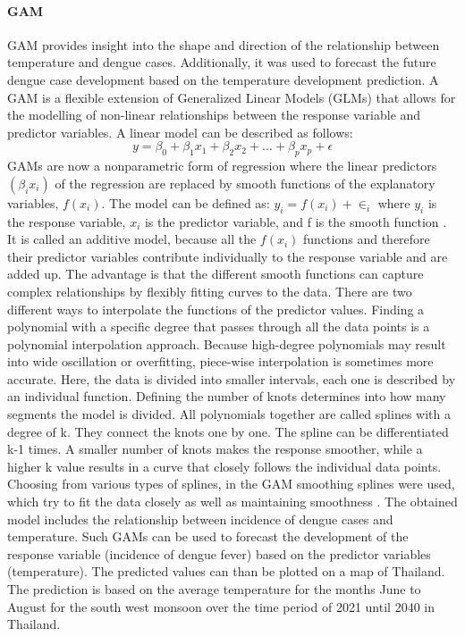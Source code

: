 	
	\paragraph{GAM}
	GAM provides insight into the shape and direction of the relationship between temperature and dengue cases. Additionally, it was used to forecast the future dengue case development based on the temperature development prediction. 
	A GAM is a flexible extension of Generalized Linear Models (GLMs) that allows for the modelling of non-linear relationships between the response variable and predictor variables. A linear model can be described as follows:
	$$y=\beta _0+\beta _1 x_1+\beta _2 x_2 +…+\beta _p x_p+\epsilon$$
	GAMs are now a nonparametric form of regression where the linear predictors $(\beta_i x_i)$ of the regression are replaced by smooth functions of the explanatory variables, $f(x_i)$. The model can be defined as:
	$y_i=f(x_i )+\in_i$
	where $y_i$ is the response variable, $x_i$ is the predictor variable, and f is the smooth function \citep{Wood2006}.
	It is called an additive model, because all the $f(x_i)$ functions and therefore their predictor variables contribute individually to the response variable and are added up. The advantage is that the different smooth functions can capture complex relationships by flexibly fitting curves to the data.
	There are two different ways to interpolate the functions of the predictor values. Finding a polynomial with a specific degree that passes through all the data points is a polynomial interpolation approach. Because high-degree polynomials may result into wide oscillation or overfitting, piece-wise interpolation is sometimes more accurate. Here, the data is divided into smaller intervals, each one is described by an individual function. Defining the number of knots determines into how many segments the model is divided. All polynomials together are called splines with a degree of k. They connect the knots one by one. The spline can be differentiated k-1 times. A smaller number of knots makes the response smoother, while a higher k value results in a curve that closely follows the individual data points. Choosing from various types of splines, in the GAM smoothing splines were used, which try to fit the data closely as well as maintaining smoothness \citep{Peri2021}.
	The obtained model includes the relationship between incidence of dengue cases and temperature. Such GAMs can be used to forecast the development of the response variable (incidence of dengue fever) based on the predictor variables (temperature). The predicted values can than be plotted on a map of Thailand. The prediction is based on the average temperature for the months June to August for the south west monsoon over the time period of 2021 until 2040 in Thailand.
	
